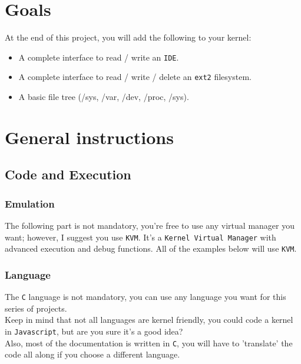 \documentclass{42-en}
\begin{document}
\chapter{Goals}

    At the end of this project, you will add the following to your kernel:
    \begin{itemize}\itemsep1pt
        \item A complete interface to read / write an \texttt{IDE}.
        \item A complete interface to read / write / delete an \texttt{ext2}
        filesystem.
        \item A basic file tree (/sys, /var, /dev, /proc, /sys).
    \end{itemize}


\chapter{General instructions}
    \section{Code and Execution}
        \subsection{Emulation}
        The following part is not mandatory, you're free to use any virtual
        manager you want; however, I suggest you use \texttt{KVM}.
        It's a \texttt{Kernel Virtual Manager} with advanced execution
        and debug functions.
        All of the examples below will use \texttt{KVM}.
        \subsection{Language}
            The \texttt{C} language is not mandatory, you can use any language
            you want for this series of projects.\\
            Keep in mind that not all languages are kernel friendly, you could
            code a kernel in \texttt{Javascript}, but are you sure it's a
            good idea?\\
            Also, most of the documentation is written in \texttt{C}, you will
            have to 'translate' the code all along if you choose a different
            language.\\
\end{document}

